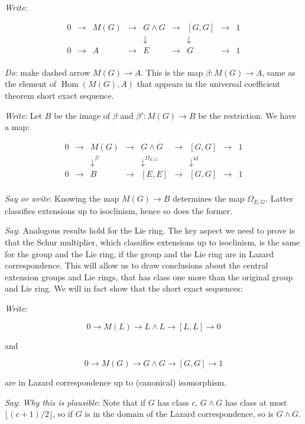 \documentclass[10pt]{amsart}
\begin{document}
{\em Write}: 

$$\begin{array}{ccccccccc}
0 & \to & M(G) & \to & G \wedge G & \to & [G,G] & \to & 1\\
 &&               && \downarrow     &&\downarrow&& \\
0 & \to & A & \to & E & \to & G & \to & 1\\
\end{array}$$

{\em Do}: make dashed arrow $M(G) \to A$.  This is the map $\beta:M(G)
\to A$, same as the element of $\operatorname{Hom}(M(G),A)$ that
appears in the universal coefficient theorem short exact sequence.

{\em Write}: Let $B$ be the image of $\beta$ and $\beta': M(G) \to B$
be the restriction. We have a map:

$$\begin{array}{ccccccccc}
0 & \to & M(G) & \to & G \wedge G & \to & [G,G] & \to & 1\\
 &&   \downarrow^{\beta'}  &&  \downarrow^{\Omega_{E,G}}     && \downarrow^{\text{id}} && \\
0 & \to & B &\to & [E,E] & \to & [G,G] & \to & 1\\
\end{array}$$

{\em Say or write}: Knowing the map $M(G) \to B$ determines the map
$\Omega_{E,G}$. Latter classifies extensions up to isoclinism, hence
so does the former.

{\em Say}: Analogous results hold for the Lie ring. The key aspect we
need to prove is that the Schur multiplier, which classifies
extensions up to isoclinism, is the same for the group and the Lie
ring, if the group and the Lie ring are in Lazard correspondence. This
will allow us to draw conclusions about the central extension groups
and Lie rings, that has class one more than the original group and Lie
ring. We will in fact show that the short exact sequences:

{\em Write}:

$$0 \to M(L) \to L \wedge L \to [L,L] \to 0$$

and

$$0 \to M(G) \to G \wedge G \to [G,G] \to 1$$

are in Lazard correspondence up to (canonical) isomorphism.

{\em Say}: {\em Why this is plausible}: Note that if $G$ has class
$c$, $G \wedge G$ has class at most $\lfloor (c + 1)/2 \rfloor$, so if
$G$ is in the domain of the Lazard correspondence, so is $G \wedge G$.
\end{document}
